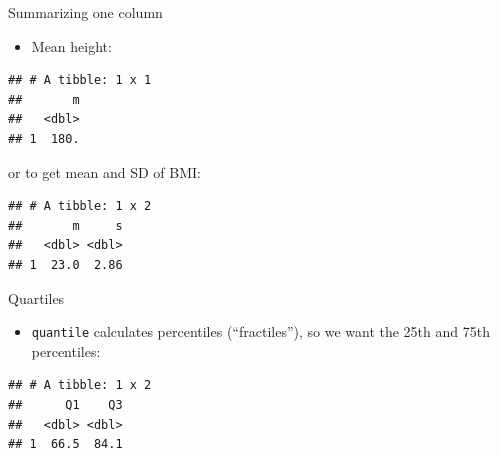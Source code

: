 \documentclass[
  ignorenonframetext,
]{beamer}
\newenvironment{Shaded}{\begin{snugshade}}{\end{snugshade}}
\newcommand{\DataTypeTok}[1]{\textcolor[rgb]{0.13,0.29,0.53}{#1}}
\newcommand{\FloatTok}[1]{\textcolor[rgb]{0.00,0.00,0.81}{#1}}
\newcommand{\KeywordTok}[1]{\textcolor[rgb]{0.13,0.29,0.53}{\textbf{#1}}}
\newcommand{\NormalTok}[1]{#1}
\newcommand{\OperatorTok}[1]{\textcolor[rgb]{0.81,0.36,0.00}{\textbf{#1}}}
\newcommand{\StringTok}[1]{\textcolor[rgb]{0.31,0.60,0.02}{#1}}
\providecommand{\tightlist}{%
  \setlength{\itemsep}{0pt}\setlength{\parskip}{0pt}}
\begin{document}
\begin{frame}[fragile]{Summarizing one column}
\protect\hypertarget{summarizing-one-column}{}

\begin{itemize}
\tightlist
\item
  Mean height:
\end{itemize}

\begin{Shaded}
\end{Shaded}

\begin{verbatim}
## # A tibble: 1 x 1
##       m
##   <dbl>
## 1  180.
\end{verbatim}

or to get mean and SD of BMI:

\begin{Shaded}
\end{Shaded}

\begin{verbatim}
## # A tibble: 1 x 2
##       m     s
##   <dbl> <dbl>
## 1  23.0  2.86
\end{verbatim}

\end{frame}

\begin{frame}[fragile]{Quartiles}
\protect\hypertarget{quartiles}{}

\begin{itemize}
\tightlist
\item
  \texttt{quantile} calculates percentiles (``fractiles''), so we want
  the 25th and 75th percentiles:
\end{itemize}

\begin{Shaded}
\end{Shaded}

\begin{verbatim}
## # A tibble: 1 x 2
##      Q1    Q3
##   <dbl> <dbl>
## 1  66.5  84.1
\end{verbatim}

\end{frame}
\end{document}
